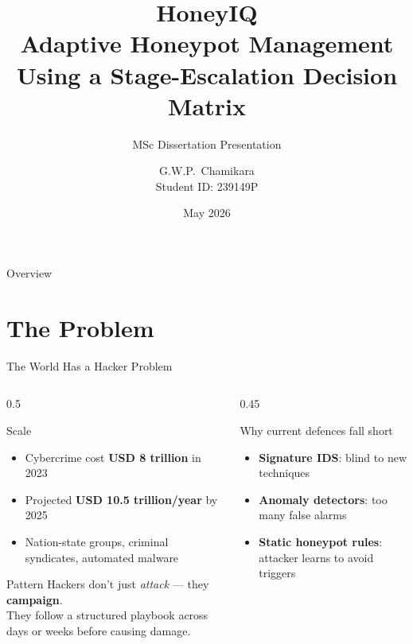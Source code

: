 \documentclass[aspectratio=169, 12pt]{beamer}
\title[HoneyIQ]{%
  \textbf{HoneyIQ}\\
  \large Adaptive Honeypot Management\\
  Using a Stage-Escalation Decision Matrix}
\subtitle{MSc Dissertation Presentation}
\author{G.W.P.\ Chamikara \\ \small Student ID: 239149P}
\institute{%
  Department of Computer Science \& Engineering\\
  Faculty of Engineering}
\date{May 2026}
\begin{document}
\begin{frame}
  \titlepage
\end{frame}

\begin{frame}{Overview}
  \tableofcontents
\end{frame}

\section{The Problem}

\begin{frame}{The World Has a Hacker Problem}
  \begin{columns}[T]
    \begin{column}{0.5\textwidth}
      \begin{alertblock}{Scale}
        \begin{itemize}
          \item Cybercrime cost \textbf{USD 8 trillion} in 2023
          \item Projected \textbf{USD 10.5 trillion/year} by 2025
          \item Nation-state groups, criminal syndicates, automated malware
        \end{itemize}
      \end{alertblock}
      \vspace{0.4cm}
      \begin{block}{Pattern}
        Hackers don't just \emph{attack} --- they \textbf{campaign}.\\
        They follow a structured playbook across days or weeks before causing damage.
      \end{block}
    \end{column}
    \begin{column}{0.45\textwidth}
      \begin{block}{Why current defences fall short}
        \begin{itemize}
          \item \textbf{Signature IDS}: blind to new techniques
          \item \textbf{Anomaly detectors}: too many false alarms
          \item \textbf{Static honeypot rules}: attacker learns to avoid triggers
        \end{itemize}
      \end{block}
    \end{column}
  \end{columns}
\end{frame}
\end{document}
